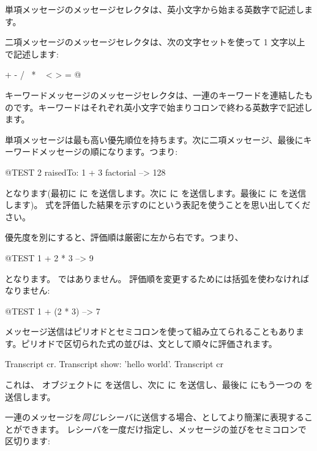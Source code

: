 \documentclass[a4paper,10pt,twoside]{book}
\begin{document}
単項メッセージのメッセージセレクタは、英小文字から始まる英数字で記述します。

二項メッセージのメッセージセレクタは、次の文字セットを使って 1 文字以上で記述します:
\begin{code}{}
+ - / \ * ~ < > = @ %
\end{code}
\noindent
キーワードメッセージのメッセージセレクタは、一連のキーワードを連結したものです。キーワードはそれぞれ英小文字で始まりコロンで終わる英数字で記述します。

単項メッセージは最も高い優先順位を持ちます。次に二項メッセージ、最後にキーワードメッセージの順になります。つまり:
\begin{code}{@TEST}
2 raisedTo: 1 + 3 factorial --> 128
\end{code}
となります(最初に  に  を送信します。次に  に  を送信します。最後に  に  を送信します)。
式を評価した結果を示すのに\ct{-->}という表記を使うことを思い出してください。

優先度を別にすると、評価順は厳密に左から右です。つまり、
\begin{code}{@TEST}
1 + 2 * 3 --> 9
\end{code}
となります。 ではありません。
評価順を変更するためには括弧を使わなければなりません:
\begin{code}{@TEST}
1 + (2 * 3) --> 7
\end{code}

メッセージ送信はピリオドとセミコロンを使って組み立てられることもあります。ピリオドで区切られた式の並びは、文として順々に評価されます。

\begin{code}{}
Transcript cr.
Transcript show: 'hello world'.
Transcript cr
\end{code}

\noindent
これは、 オブジェクトに  を送信し、次に  に  を送信し、最後に  にもう一つの  を送信します。

一連のメッセージを\emph{同じ}レシーバに送信する場合、としてより簡潔に表現することができます。
レシーバを一度だけ指定し、メッセージの並びをセミコロンで区切ります:
\end{document}
